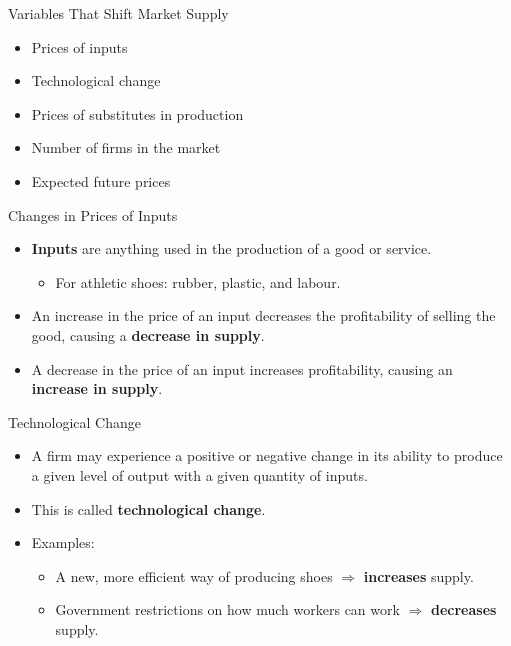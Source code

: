\documentclass[aspectratio=169]{beamer}
\begin{document}
\begin{frame}{Variables That Shift Market Supply}
\transfade
\begin{itemize}[<+->]
  \item Prices of inputs
  \item Technological change
  \item Prices of substitutes in production
  \item Number of firms in the market
  \item Expected future prices
\end{itemize}
\end{frame}

\begin{frame}{Changes in Prices of Inputs}
\transfade
\begin{itemize}[<+->]
  \item \textbf{Inputs} are anything used in the production of a good or service.
  \begin{itemize}[<+->]
    \item For athletic shoes: rubber, plastic, and labour.
  \end{itemize}
  \item An \alert{increase} in the price of an input decreases the profitability of selling the good, causing a \textbf{decrease in supply}.
  \item A \alert{decrease} in the price of an input increases profitability, causing an \textbf{increase in supply}.
\end{itemize}
\end{frame}

\begin{frame}{Technological Change}
\transfade
\begin{itemize}[<+->]
  \item A firm may experience a positive or negative change in its ability to produce a given level of output with a given quantity of inputs.
  \item This is called \textbf{technological change}.
  \item Examples:
  \begin{itemize}[<+->]
    \item A new, more efficient way of producing shoes \(\Rightarrow\) \textbf{increases} supply.
    \item Government restrictions on how much workers can work \(\Rightarrow\) \textbf{decreases} supply.
  \end{itemize}
\end{itemize}
\end{frame}
\end{document}
